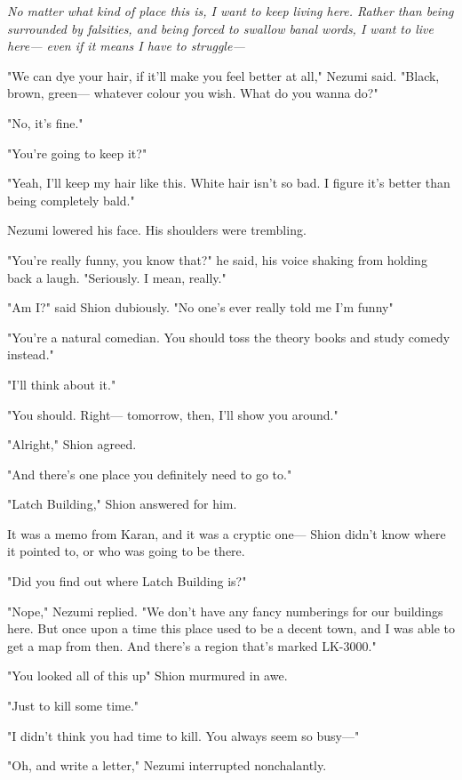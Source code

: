 \emph{No matter what kind of place this is, I want to keep living here. Rather
than being surrounded by falsities, and being forced to swallow banal
words, I want to live here--- even if it means I have to struggle---}

"We can dye your hair, if it'll make you feel better at all," Nezumi
said. "Black, brown, green--- whatever colour you wish. What do you wanna
do?"

"No, it's fine."

"You're going to keep it?"

"Yeah, I'll keep my hair like this. White hair isn't so bad. I figure
it's better than being completely bald."

Nezumi lowered his face. His shoulders were trembling.

"You're really funny, you know that?" he said, his voice shaking from
holding back a laugh. "Seriously. I mean, really."

"Am I?" said Shion dubiously. "No one's ever really told me I'm
funny\el "

"You're a natural comedian. You should toss the theory books and study
comedy instead."

"I'll think about it."

"You should. Right--- tomorrow, then, I'll show you around."

"Alright," Shion agreed.

"And there's one place you definitely need to go to."

"Latch Building," Shion answered for him.


It was a memo from Karan, and it was a cryptic one--- Shion didn't know
where it pointed to, or who was going to be there.

"Did you find out where Latch Building is?"

"Nope," Nezumi replied. "We don't have any fancy numberings for our
buildings here. But once upon a time this place used to be a decent
town, and I was able to get a map from then. And there's a region that's
marked LK-3000."

"You looked all of this up\el " Shion murmured in awe.

"Just to kill some time."

"I didn't think you had time to kill. You always seem so busy---"

"Oh, and write a letter," Nezumi interrupted nonchalantly.

